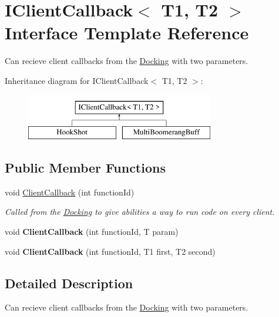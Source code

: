 \hypertarget{interface_i_client_callback}{}\section{I\+Client\+Callback$<$ T1, T2 $>$ Interface Template Reference}
\label{interface_i_client_callback}


Can recieve client callbacks from the \hyperlink{class_docking}{Docking} with two parameters.  


Inheritance diagram for I\+Client\+Callback$<$ T1, T2 $>$\+:\begin{figure}[H]
\begin{center}
\leavevmode
\includegraphics[height=2.000000cm]{interface_i_client_callback}
\end{center}
\end{figure}
\subsection*{Public Member Functions}
\begin{DoxyCompactItemize}
\item 
void \hyperlink{interface_i_client_callback_ae3a4979dfd1f596661e996d05afacbdf}{Client\+Callback} (int function\+Id)
\begin{DoxyCompactList}\small\item\em Called from the \hyperlink{class_docking}{Docking} to give abilities a way to run code on every client. \end{DoxyCompactList}\item 
\hypertarget{interface_i_client_callback_a527e29ea68912a72714a7cc410c43c18}{}\label{interface_i_client_callback_a527e29ea68912a72714a7cc410c43c18} 
void {\bfseries Client\+Callback} (int function\+Id, T param)
\item 
\hypertarget{interface_i_client_callback_a617d7bca5ad14203bdb39fb0256d7bba}{}\label{interface_i_client_callback_a617d7bca5ad14203bdb39fb0256d7bba} 
void {\bfseries Client\+Callback} (int function\+Id, T1 first, T2 second)
\end{DoxyCompactItemize}


\subsection{Detailed Description}
Can recieve client callbacks from the \hyperlink{class_docking}{Docking} with two parameters. 



